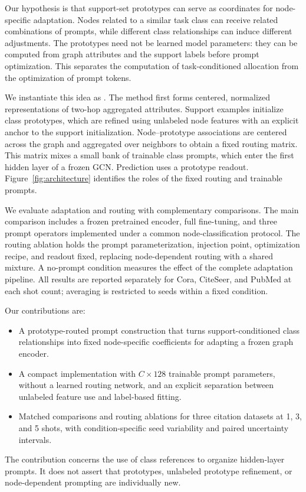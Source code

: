 Our hypothesis is that support-set prototypes can serve as coordinates for node-specific adaptation. Nodes related to a similar task class can receive related combinations of prompts, while different class relationships can induce different adjustments. The prototypes need not be learned model parameters: they can be computed from graph attributes and the support labels before prompt optimization. This separates the computation of task-conditioned allocation from the optimization of prompt tokens.

We instantiate this idea as \method. The method first forms centered, normalized representations of two-hop aggregated attributes. Support examples initialize class prototypes, which are refined using unlabeled node features with an explicit anchor to the support initialization. Node--prototype associations are centered across the graph and aggregated over neighbors to obtain a fixed routing matrix. This matrix mixes a small bank of trainable class prompts, which enter the first hidden layer of a frozen GCN. Prediction uses a prototype readout. Figure~\ref{fig:architecture} identifies the roles of the fixed routing and trainable prompts.

We evaluate adaptation and routing with complementary comparisons. The main comparison includes a frozen pretrained encoder, full fine-tuning, and three prompt operators implemented under a common node-classification protocol. The routing ablation holds the prompt parameterization, injection point, optimization recipe, and readout fixed, replacing node-dependent routing with a shared mixture. A no-prompt condition measures the effect of the complete adaptation pipeline. All results are reported separately for Cora, CiteSeer, and PubMed at each shot count; averaging is restricted to seeds within a fixed condition.

Our contributions are:
\begin{itemize}
\item A prototype-routed prompt construction that turns support-conditioned class relationships into fixed node-specific coefficients for adapting a frozen graph encoder.
\item A compact implementation with $C\times128$ trainable prompt parameters, without a learned routing network, and an explicit separation between unlabeled feature use and label-based fitting.
\item Matched comparisons and routing ablations for three citation datasets at 1, 3, and 5 shots, with condition-specific seed variability and paired uncertainty intervals.
\end{itemize}
The contribution concerns the use of class references to organize hidden-layer prompts. It does not assert that prototypes, unlabeled prototype refinement, or node-dependent prompting are individually new.


